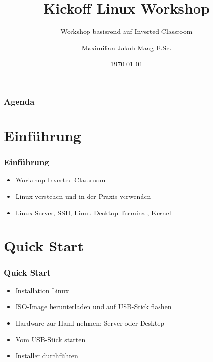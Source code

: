 \documentclass{beamer}
\title{Kickoff Linux Workshop}
\subtitle{Workshop basierend auf Inverted Classroom}
\author{Maximilian Jakob Maag B.Sc.}
\date{\today}
\begin{document}
    \begin{frame}
        \titlepage
    \end{frame}
    \begin{frame}
        \frametitle{Agenda}
        \tableofcontents
    \end{frame}
    \section{Einführung}
    \begin{frame}
        \frametitle{Einführung}
        \begin{itemize}
            \item Workshop Inverted Classroom
            \item Linux verstehen und in der Praxis verwenden
            \item Linux Server, SSH, Linux Desktop Terminal, Kernel
        \end{itemize}
    \end{frame}
    \section{Quick Start}
    \begin{frame}
        \frametitle{Quick Start}
        \begin{itemize}
            \item Installation Linux
            \item ISO-Image herunterladen und auf USB-Stick flashen
            \item Hardware zur Hand nehmen: Server oder Desktop
            \item Vom USB-Stick starten
            \item Installer durchführen
        \end{itemize}
    \end{frame}
\end{document}
